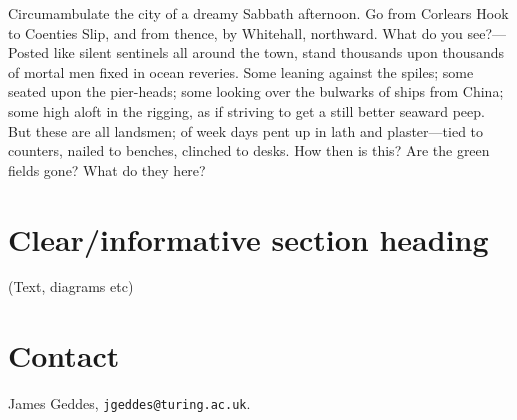 \documentclass[a4paper, twocolumn, 12pt]{article}
\begin{document}
Circumambulate the city of a dreamy Sabbath afternoon. Go from Corlears Hook to
Coenties Slip, and from thence, by Whitehall, northward. What do you see?—Posted
like silent sentinels all around the town, stand thousands upon thousands of
mortal men fixed in ocean reveries. Some leaning against the spiles; some seated
upon the pier-heads; some looking over the bulwarks of ships from China; some
high aloft in the rigging, as if striving to get a still better seaward
peep. But these are all landsmen; of week days pent up in lath and plaster—tied
to counters, nailed to benches, clinched to desks. How then is this? Are the
green fields gone? What do they here?

\section*{Clear/informative section heading}
(Text, diagrams etc)

\vfill
\section*{Contact}

James Geddes, \texttt{jgeddes@turing.ac.uk}.
\end{document}
